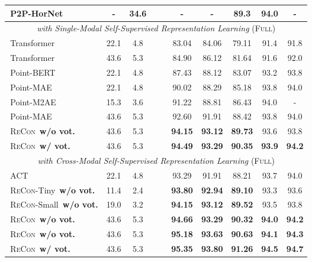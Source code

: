 \documentclass{article}
\theoremstyle{plain}
\theoremstyle{definition}
\theoremstyle{remark}
\def\recon{{\scshape ReCon}}
\newcommand{\reconcolor}[1]{\textcolor{reconcolor}{#1}}
\newcommand{\vitcolor}[1]{\textcolor{vitcolor}{#1}}
\newcommand{\br}{\reconcolor{\,}} \newcommand{\bv}{\vitcolor{\,}}  \newcommand{\bs}{\vitcolor{\,}} \newcommand{\bh}{\reconcolor{\,}}
\begin{document}
\begin{table*}[ht!]
\begin{center}
{\begin{tabular}{lccccccccc}
\bs P2P-HorNet~\citep{P2P} & - & 34.6 &  &  & - & - & 89.3 & 94.0 & -\\
\midrule[0.6pt]
\multicolumn{10}{c}{\textit{with Single-Modal Self-Supervised Representation Learning} ({\scshape Full})}\\
\midrule[0.6pt]
\bv Transformer~\citep{AttentionIsAllYouNeed} & 22.1 & 4.8 &  &  & 83.04 & 84.06 & 79.11 & 91.4 & 91.8\\
\br Transformer~\citep{AttentionIsAllYouNeed} & 43.6 & 5.3 &  &  & 84.90 & 86.12 & 81.64 & 91.6 & 92.0\\
\bv Point-BERT~\citep{PointBERT} & 22.1 & 4.8 &  &  & 87.43 & 88.12 & 83.07 & 93.2 & 93.8\\
\bv Point-MAE~\citep{PointMAE} & 22.1 & 4.8 &  &  & 90.02 & 88.29 & 85.18 & 93.8 & 94.0\\
\bh Point-M2AE~\citep{PointM2AE22} & 15.3 & 3.6 &  &  & 91.22 & 88.81 & 86.43 & 94.0 & -\\
\br Point-MAE~\citep{PointMAE} & 43.6 & 5.3 &  &  & 92.60 & 91.91 & 88.42 & 93.8 & 94.0\\
\rowcolor{linecolor2}\br\recon~\textbf{w/o vot.} & 43.6 & 5.3 &  &  & \textbf{94.15} & \textbf{93.12} & \textbf{89.73} & 93.6 & 93.8\\
\rowcolor{linecolor}\br\recon~\textbf{w/ vot.} & 43.6 & 5.3 &  &  & \textbf{94.49} & \textbf{93.29} & \textbf{90.35} & \textbf{93.9} & \textbf{94.2}\\
\midrule[0.6pt]
\multicolumn{10}{c}{\textit{with Cross-Modal Self-Supervised Representation Learning} ({\scshape Full})}\\
\midrule[0.6pt]
\bv ACT~\citep{ACT23} & 22.1 & 4.8 &  &  & 93.29 & 91.91 & 88.21 & 93.7 & 94.0\\
\rowcolor{linecolor1}\br\recon-Tiny~\textbf{w/o vot.} & 11.4 & 2.4 &  &  & \textbf{93.80} & \textbf{92.94} & \textbf{89.10} & 93.3 & 93.6\\
\rowcolor{linecolor2}\br\recon-Small~\textbf{w/o vot.} & 19.0 & 3.2 &  &  & \textbf{94.15} & \textbf{93.12} & \textbf{89.52} & 93.5 & 93.8\\
\rowcolor{linecolor1}\br\recon~\textbf{w/o vot.} & 43.6 & 5.3 &  &  & \textbf{94.66} & \textbf{93.29} & \textbf{90.32} & \textbf{94.0} & \textbf{94.2}\\
\rowcolor{linecolor2}\br\recon~\textbf{w/o vot.} & 43.6 & 5.3 &  &  & \textbf{95.18} & \textbf{93.63} & \textbf{90.63} & \textbf{94.1} & \textbf{94.3}\\
\rowcolor{linecolor}\br\recon~\textbf{w/ vot.} & 43.6 & 5.3 &  &  & \textbf{95.35} & \textbf{93.80} & \textbf{91.26} & \textbf{94.5} & \textbf{94.7}\\

\end{tabular}}
\end{center}
\end{table*}
\end{document}
